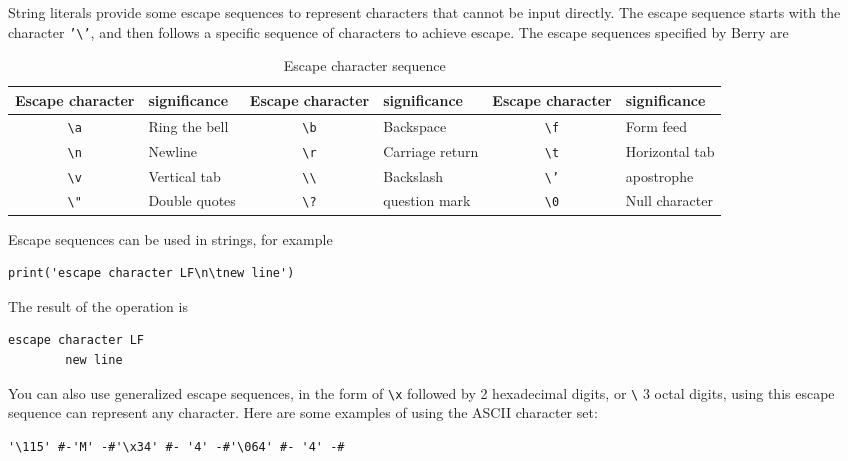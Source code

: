 String literals provide some escape sequences to represent characters that cannot be input directly. The escape sequence starts with the character \texttt{'\textbackslash'}, and then follows a specific sequence of characters to achieve escape. The escape sequences specified by Berry are
\begin{table}[htb]
    \centering
    \setlength{\tabcolsep}{4mm}
    \begin{tabular}{clclcl} \toprule
        \textbf{Escape character} & \textbf{significance} & \textbf{Escape character} & \textbf{significance} & \textbf{Escape character} & \textbf{significance} \\ \midrule
        \texttt{\textbackslash a} & Ring the bell & \texttt{\textbackslash b} & Backspace & \texttt{\textbackslash f} & Form feed \\
        \texttt{\textbackslash n} & Newline & \texttt{\textbackslash r} & Carriage return & \texttt{\textbackslash t} & Horizontal tab \\
        \texttt{\textbackslash v} & Vertical tab & \texttt{\textbackslash \textbackslash} & Backslash & \texttt{\textbackslash '} & apostrophe \\
        \texttt{\textbackslash "} & Double quotes & \texttt{\textbackslash ?} & question mark & \texttt{\textbackslash 0} & Null character \\
        \bottomrule
    \end{tabular}
    \caption{Escape character sequence}
    \label{tab::escape_character}
\end{table}

Escape sequences can be used in strings, for example
\begin{lstlisting}[language=berry, numbers=none]
print('escape character LF\n\tnew line')
\end{lstlisting}
The result of the operation is
\begin{lstlisting}[numbers=none]
escape character LF
        new line
\end{lstlisting}

You can also use generalized escape sequences, in the form of \texttt{\textbackslash x} followed by 2 hexadecimal digits, or \texttt{\textbackslash} 3 octal digits, using this escape sequence can represent any character. Here are some examples of using the ASCII character set:
\begin{lstlisting}[language=berry, numbers=none]
'\115' #-'M' -#'\x34' #- '4' -#'\064' #- '4' -#
\end{lstlisting}

